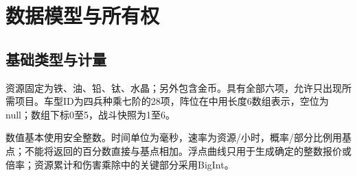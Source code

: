 \chapter{数据模型与所有权}
\section{基础类型与计量}
资源固定为铁、油、铅、钛、水晶；另外包含金币。具有全部六项，允许只出现所需项目。车型ID为四兵种乘七阶的28项，阵位在中用长度6数组表示，空位为null；数组下标0至5，战斗快照为1至6。

数值基本使用安全整数。时间单位为毫秒，速率为资源/小时，概率/部分比例用基点；不能将返回的百分数直接与基点相加。浮点曲线只用于生成确定的整数报价或倍率；资源累计和伤害乘除中的关键部分采用BigInt。

